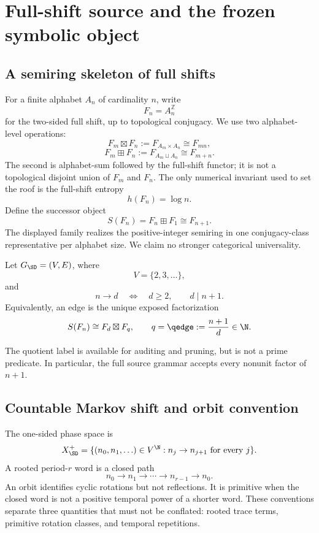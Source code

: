 \section{Full-shift source and the frozen symbolic object}
\label{sec:source}

\subsection{A semiring skeleton of full shifts}

For a finite alphabet \(A_n\) of cardinality \(n\), write
\[
 F_n=A_n^{\mathbb Z}
\]
for the two-sided full shift, up to topological conjugacy.  We use two
alphabet-level operations:
\[
 F_m\boxtimes F_n
 :=F_{A_m\times A_n}\cong F_{mn},
\]
\[
 F_m\boxplus F_n
 :=F_{A_m\sqcup A_n}\cong F_{m+n}.
\]
The second is alphabet-sum followed by the full-shift functor; it is not a
topological disjoint union of \(F_m\) and \(F_n\).  The only numerical
invariant used to set the roof is the full-shift entropy
\[
 h(F_n)=\log n.
\]
Define the successor object
\[
 S(F_n)=F_n\boxplus F_1\cong F_{n+1}.
\]
The displayed family realizes the positive-integer semiring in one
conjugacy-class representative per alphabet size.  We claim no stronger
categorical universality.

\begin{definition}
\label{def:graph}
Let \(G_{\SD}=(V,E)\), where
\[
 V=\{2,3,\ldots\},
\]
and
\[
 n\to d
 \quad\Longleftrightarrow\quad
 d\ge2,\qquad d\mid n+1.
\]
Equivalently, an edge is the unique exposed factorization
\[
 S(F_n)\cong F_d\boxtimes F_q,
 \qquad
 q=\qedge:=\frac{n+1}{d}\in\N.
\]
\end{definition}

The quotient label is available for auditing and pruning, but is not a prime
predicate.  In particular, the full source grammar accepts every nonunit
factor of \(n+1\).

\subsection{Countable Markov shift and orbit convention}

The one-sided phase space is
\[
 X_{\SD}^{+}
 =
 \{(n_0,n_1,\ldots)\in V^{\N}:
   n_j\to n_{j+1}\text{ for every }j\}.
\]
A rooted period-\(r\) word is a closed path
\[
 n_0\to n_1\to\cdots\to n_{r-1}\to n_0.
\]
An orbit identifies cyclic rotations but not reflections.  It is primitive
when the closed word is not a positive temporal power of a shorter word.
These conventions separate three quantities that must not be conflated:
rooted trace terms, primitive rotation classes, and temporal repetitions.

